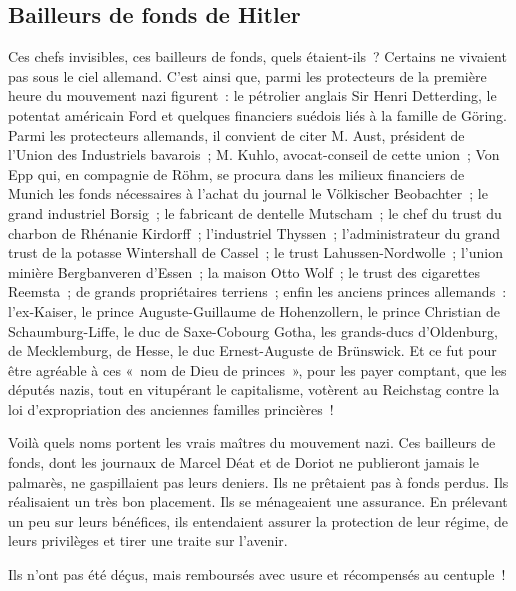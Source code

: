 \documentclass[french,twoside]{book} %
\begin{document}
\subsection[Bailleurs de fonds de Hitler]{Bailleurs de fonds de Hitler}
\noindent Ces chefs invisibles, ces bailleurs de fonds, quels étaient-ils ? Certains ne vivaient pas sous le ciel allemand. C’est ainsi que, parmi les protecteurs de la première heure du mouvement nazi figurent : le pétrolier anglais Sir Henri Detterding, le potentat américain Ford et quelques financiers suédois liés à la famille de Göring. Parmi les protecteurs allemands, il convient de citer M. Aust, président de l’Union des Industriels bavarois ; M. Kuhlo, avocat-conseil de cette union ; Von Epp qui, en compagnie de Röhm, se procura dans les milieux financiers de Munich les fonds nécessaires à l’achat du journal le Völkischer Beobachter ; le grand industriel Borsig ; le fabricant de dentelle Mutscham ; le chef du trust du charbon de Rhénanie Kirdorff ; l’industriel Thyssen ; l’administrateur du grand trust de la potasse Wintershall de Cassel ; le trust Lahussen-Nordwolle ; l’union minière Bergbanveren d’Essen ; la maison Otto Wolf ; le trust des cigarettes Reemsta ; de grands propriétaires terriens ; enfin les anciens princes allemands : l’ex-Kaiser, le prince Auguste-Guillaume de Hohenzollern, le prince Christian de Schaumburg-Liffe, le duc de Saxe-Cobourg Gotha, les grands-ducs d’Oldenburg, de Mecklemburg, de Hesse, le duc Ernest-Auguste de Brünswick. Et ce fut pour être agréable à ces « nom de Dieu de princes », pour les payer comptant, que les députés nazis, tout en vitupérant le capitalisme, votèrent au Reichstag contre la loi d’expropriation des anciennes familles princières !\par
Voilà quels noms portent les vrais maîtres du mouvement nazi. Ces bailleurs de fonds, dont les journaux de Marcel Déat et de Doriot ne publieront jamais le palmarès, ne gaspillaient pas leurs deniers. Ils ne prêtaient pas à fonds perdus. Ils réalisaient un très bon placement. Ils se ménageaient une assurance. En prélevant un peu sur leurs bénéfices, ils entendaient assurer la protection de leur régime, de leurs privilèges et tirer une traite sur l’avenir.\par
Ils n’ont pas été déçus, mais remboursés avec usure et récompensés au centuple !
\renewcommand{\leftmark}{5 – L’escroquerie du programme : Bons et mauvais capitalistes}
\end{document}
